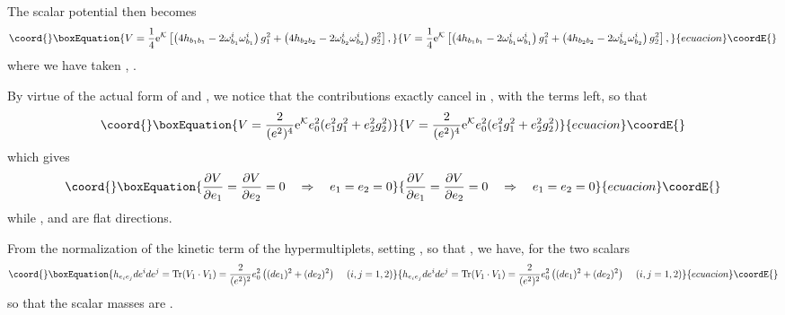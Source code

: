 \documentclass[a4paper,12pt]{article}
\begin{document}
The scalar potential then becomes
\begin{equation}\coord{}\boxEquation{
V =\frac 14 {\rm e}^{\mathcal K}\left[ \left(4 h_{b_1 b_1} - 2 \omega^i_{b_1} \omega^i_{b_1}\right)g_1^2 +
 \left(4 h_{b_2 b_2} - 2 \omega^i_{b_2} \omega^i_{b_2}\right)g_2^2 \right]
, \label{potentialsimpl}
}{
V =\frac 14 {\rm e}^{\mathcal K}\left[ \left(4 h_{b_1 b_1} - 2 \omega^i_{b_1} \omega^i_{b_1}\right)g_1^2 +
 \left(4 h_{b_2 b_2} - 2 \omega^i_{b_2} \omega^i_{b_2}\right)g_2^2 \right]
, }{ecuacion}\coordE{}\end{equation}
where we have taken \coordHE{}, \coordHE{}.

By virtue of the actual form of \coordHE{} and \coordHE{}, we notice that the \coordHE{} contributions
exactly cancel in \coordHE{}, with the \coordHE{} terms left, so that
\begin{equation}\coord{}\boxEquation{
V=\frac 2{(e^2)^4} {\rm e}^{\mathcal K}  e_0^2 (e_1^2 g_1^2 + e_2^2 g_2^2)
}{
V=\frac 2{(e^2)^4} {\rm e}^{\mathcal K}  e_0^2 (e_1^2 g_1^2 + e_2^2 g_2^2)
}{ecuacion}\coordE{}\end{equation}
which gives
\begin{equation}\coord{}\boxEquation{
\frac{\partial V}{\partial e_1} = \frac{\partial V}{\partial e_2}=0 \quad \Rightarrow \quad e_1 =e_2 =0
}{
\frac{\partial V}{\partial e_1} = \frac{\partial V}{\partial e_2}=0 \quad \Rightarrow \quad e_1 =e_2 =0
}{ecuacion}\coordE{}\end{equation}
while \coordHE{}, \coordHE{} and \coordHE{} are flat directions.

From the normalization of the kinetic term of the hypermultiplets, setting \coordHE{}, so that \coordHE{}, we have, for the two scalars \coordHE{} 
  \begin{equation}\coord{}\boxEquation{
h_{e_i e_j }de^i de^j = {\rm Tr}(V_1\cdot V_1) = \frac 2{(e^2)^2}
e_0^2 \left((de_1)^2 + (de_2)^2\right) \, \quad (i,j=1,2)
}{
h_{e_i e_j }de^i de^j = {\rm Tr}(V_1\cdot V_1) = \frac 2{(e^2)^2}
e_0^2 \left((de_1)^2 + (de_2)^2\right) \, \quad (i,j=1,2)
}{ecuacion}\coordE{}\end{equation}
so that the scalar masses are \coordHE{}.
\end{document}
